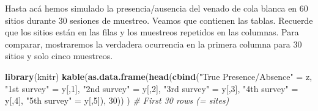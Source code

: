 \documentclass[
]{book}
\newenvironment{Shaded}{\begin{snugshade}}{\end{snugshade}}
\newcommand{\CommentTok}[1]{\textcolor[rgb]{0.56,0.35,0.01}{\textit{#1}}}
\newcommand{\DecValTok}[1]{\textcolor[rgb]{0.00,0.00,0.81}{#1}}
\newcommand{\KeywordTok}[1]{\textcolor[rgb]{0.13,0.29,0.53}{\textbf{#1}}}
\newcommand{\NormalTok}[1]{#1}
\newcommand{\StringTok}[1]{\textcolor[rgb]{0.31,0.60,0.02}{#1}}
\begin{document}
Hasta acá hemos simulado la presencia/ausencia del venado de cola blanca en 60 sitios durante 30 sesiones de muestreo. Veamos que contienen las tablas. Recuerde que los sitios están en las filas y los muestreos repetidos en las columnas. Para comparar, mostraremos la verdadera ocurrencia en la primera columna para 30 sitios y solo cinco muestreos.

\begin{Shaded}
\begin{Highlighting}[]
\KeywordTok{library}\NormalTok{(knitr)}
\KeywordTok{kable}\NormalTok{(}\KeywordTok{as.data.frame}\NormalTok{(}\KeywordTok{head}\NormalTok{(}\KeywordTok{cbind}\NormalTok{(}\StringTok{"True Presence/Absence"}\NormalTok{ =}\StringTok{ }\NormalTok{z, }
           \StringTok{"1st survey"}\NormalTok{ =}\StringTok{ }\NormalTok{y[,}\DecValTok{1}\NormalTok{], }
           \StringTok{"2nd survey"}\NormalTok{ =}\StringTok{ }\NormalTok{y[,}\DecValTok{2}\NormalTok{], }
           \StringTok{"3rd survey"}\NormalTok{ =}\StringTok{ }\NormalTok{y[,}\DecValTok{3}\NormalTok{],}
           \StringTok{"4th survey"}\NormalTok{ =}\StringTok{ }\NormalTok{y[,}\DecValTok{4}\NormalTok{],}
           \StringTok{"5th survey"}\NormalTok{ =}\StringTok{ }\NormalTok{y[,}\DecValTok{5}\NormalTok{]), }\DecValTok{30}\NormalTok{)) )   }\CommentTok{# First 30 rows (= sites)}
\end{Highlighting}
\end{Shaded}
\end{document}
